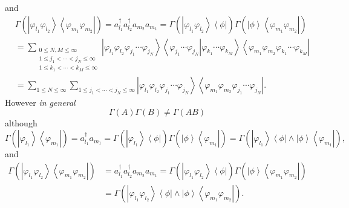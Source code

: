 \documentclass[aps,preprint]{revtex4}%
\begin{document}
and%
\begin{align}
&  \Gamma\left(  \left\vert \varphi_{l_{1}}\varphi_{l_{2}}\right\rangle
\left\langle \varphi_{m_{1}}\varphi_{m_{2}}\right\vert \right)  =a_{l_{1}%
}^{\dagger}a_{l_{2}}^{\dagger}a_{m_{2}}a_{m_{1}}=\Gamma\left(  \left\vert
\varphi_{l_{1}}\varphi_{l_{2}}\right\rangle \left\langle \phi\right\vert
\right)  \Gamma\left(  \left\vert \phi\right\rangle \left\langle
\varphi_{m_{1}}\varphi_{m_{2}}\right\vert \right) \nonumber\\
&  =\sum_{\substack{0\leq N,M\leq\infty\\1\leq j_{1}<\cdots<j_{N}\leq
\infty\\1\leq k_{1}<\cdots<k_{M}\leq\infty}}\left\vert \varphi_{l_{1}}%
\varphi_{l_{2}}\varphi_{j_{1}}\cdots\varphi_{j_{N}}\right\rangle \left\langle
\left.  \varphi_{j_{1}}\cdots\varphi_{j_{N}}\right\vert \varphi_{k_{1}}%
\cdots\varphi_{k_{M}}\right\rangle \left\langle \varphi_{m_{1}}\varphi_{m_{2}%
}\varphi_{k_{1}}\cdots\varphi_{k_{M}}\right\vert \nonumber\\
&  =\sum_{1\leq N\leq\infty}\sum_{1\leq j_{1}<\cdots<j_{N}\leq\infty
}\left\vert \varphi_{l_{1}}\varphi_{l_{2}}\varphi_{j_{1}}\cdots\varphi_{j_{N}%
}\right\rangle \left\langle \varphi_{m_{1}}\varphi_{m_{2}}\varphi_{j_{1}%
}\cdots\varphi_{j_{N}}\right\vert .
\end{align}
However \emph{in general}
\begin{equation}
\Gamma(A)\Gamma(B)\neq\Gamma(AB)
\end{equation}
although
\begin{equation}
\Gamma\left(  \left\vert \varphi_{l_{1}}\right\rangle \left\langle
\varphi_{m_{1}}\right\vert \right)  =a_{l_{1}}^{\dagger}a_{m_{1}}%
=\Gamma\left(  \left\vert \varphi_{l_{1}}\right\rangle \left\langle
\phi\right\vert \right)  \Gamma\left(  \left\vert \phi\right\rangle
\left\langle \varphi_{m_{1}}\right\vert \right)  =\Gamma\left(  \left\vert
\varphi_{l_{1}}\right\rangle \left\langle \phi\right\vert \wedge\left\vert
\phi\right\rangle \left\langle \varphi_{m_{1}}\right\vert \right)  ,
\end{equation}
and%
\begin{align}
\Gamma\left(  \left\vert \varphi_{l_{1}}\varphi_{l_{2}}\right\rangle
\left\langle \varphi_{m_{1}}\varphi_{m_{2}}\right\vert \right)   &  =a_{l_{1}%
}^{\dagger}a_{l_{2}}^{\dagger}a_{m_{2}}a_{m_{1}}=\Gamma\left(  \left\vert
\varphi_{l_{1}}\varphi_{l_{2}}\right\rangle \left\langle \phi\right\vert
\right)  \Gamma\left(  \left\vert \phi\right\rangle \left\langle
\varphi_{m_{1}}\varphi_{m_{2}}\right\vert \right) \nonumber\\
&  =\Gamma\left(  \left\vert \varphi_{l_{1}}\varphi_{l_{2}}\right\rangle
\left\langle \phi\right\vert \wedge\left\vert \phi\right\rangle \left\langle
\varphi_{m_{1}}\varphi_{m_{2}}\right\vert \right)  .
\end{align}
\end{document}
